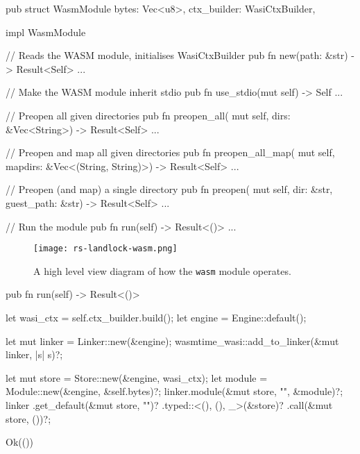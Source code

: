 \vspace*{0.5cm}

\begin{code}[language=Rust, caption=The outline of the \texttt{wasm} module., label=lst:wasm-module-outline]
pub struct WasmModule {
  bytes: Vec<u8>, ctx_builder: WasiCtxBuilder,
}

impl WasmModule {
  // Reads the WASM module, initialises WasiCtxBuilder
  pub fn new(path: &str) -> Result<Self> {...}

  // Make the WASM module inherit stdio
  pub fn use_stdio(mut self) -> Self {...}

  // Preopen all given directories
  pub fn preopen_all(
    mut self,
    dirs: &Vec<String>) -> Result<Self> {...}
  
  // Preopen and map all given directories
  pub fn preopen_all_map(
    mut self,
    mapdirs: &Vec<(String, String)>) -> Result<Self> {...}

  // Preopen (and map) a single directory
  pub fn preopen(
    mut self,
    dir: &str, guest_path: &str) -> Result<Self> {...}
  
  // Run the module
  pub fn run(self) -> Result<()> {...}
}  
\end{code}

\begin{figure}[ht]
  \centering
  \texttt{[image: rs-landlock-wasm.png]}
  \caption{A high level view diagram of how the \texttt{wasm} module operates.}
  \label{fig:wasm-module}
\end{figure}

\begin{code}[language=Rust, caption=The implementation of \texttt{WasmModule}'s \texttt{run} function., label=lst:wasm-module-run-function]
pub fn run(self) -> Result<()> {
  let wasi_ctx = self.ctx_builder.build();
  let engine = Engine::default();

  let mut linker = Linker::new(&engine);
  wasmtime_wasi::add_to_linker(&mut linker, |s| s)?;

  let mut store = Store::new(&engine, wasi_ctx);
  let module = Module::new(&engine, &self.bytes)?;
  linker.module(&mut store, "", &module)?;
  linker
    .get_default(&mut store, "")?
    .typed::<(), (), _>(&store)?
    .call(&mut store, ())?;

  Ok(())
}
\end{code}

